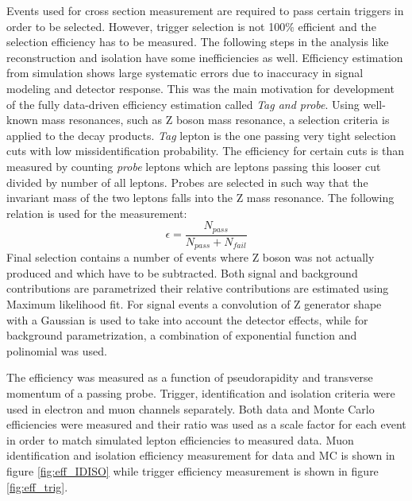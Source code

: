 Events used for cross section measurement are required to pass certain triggers in order to be selected. However, trigger selection is not 100$\%$ efficient and the selection efficiency has to be measured. The following steps in the analysis like reconstruction and isolation have some inefficiencies as well. Efficiency estimation from simulation shows large systematic errors due to inaccuracy in signal modeling and detector response. This was the main motivation for development of the fully data-driven efficiency estimation called \textit{Tag and probe}. Using well-known mass resonances, such as Z boson mass resonance, a selection criteria is applied to the decay products. \textit{Tag} lepton is the one passing very tight selection cuts with low missidentification probability. The efficiency for certain cuts is than measured by counting \textit{probe} leptons which are leptons passing this looser cut divided by number of all leptons. Probes are selected in such way that the invariant mass of the two leptons falls into the Z mass resonance. The following relation is used for the measurement:
\begin{equation}
\epsilon = \frac{N_{pass}}{N_{pass}+N_{fail}}
\end{equation}   
Final selection contains a number of events where Z boson was not actually produced and which have to be subtracted. Both signal and background contributions are parametrized their relative contributions are estimated using Maximum likelihood fit. For signal events a convolution of Z generator shape with a Gaussian is used to take into account the detector effects, while for background parametrization, a combination of exponential function and polinomial was used.
\par The efficiency was measured as a function of pseudorapidity and transverse momentum of a passing probe. Trigger, identification and isolation criteria were used in electron and muon channels separately. Both data and Monte Carlo efficiencies were measured and their ratio was used as a scale factor for each event in order to match simulated lepton efficiencies to measured data. Muon identification and isolation efficiency measurement for data and MC is shown in figure \ref{fig:eff_IDISO} while trigger efficiency measurement is shown in figure \ref{fig:eff_trig}.

